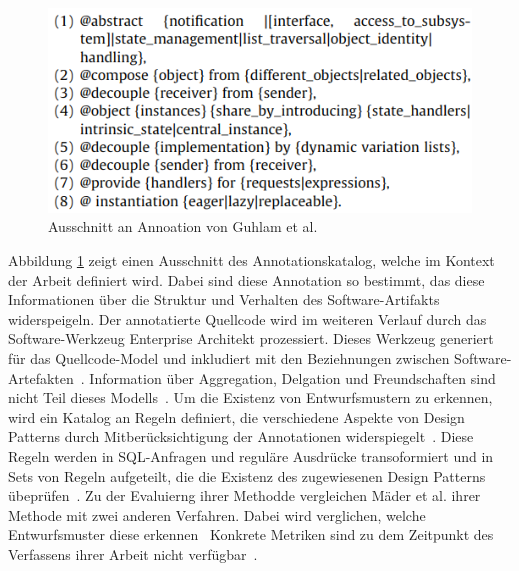 \begin{figure}[h]
    \centering
    \includegraphics{figures/annotations.png}
    \caption{Ausschnitt an Annoation von Guhlam et al.}
    \label{fig:annotations}
\end{figure}

Abbildung \ref{fig:annotations} zeigt einen Ausschnitt des Annotationskatalog, welche im Kontext der Arbeit definiert wird. Dabei sind diese Annotation so bestimmt, das diese Informationen über die Struktur und Verhalten des Software-Artifakts widerspeigeln.
Der annotatierte Quellcode wird im weiteren Verlauf durch das Software-Werkzeug Enterprise Architekt prozessiert. Dieses Werkzeug generiert für das Quellcode-Model und inkludiert mit den Beziehnungen zwischen Software-Artefakten~\cite[S. 521]{Ghula-2010}. Information über Aggregation, Delgation und Freundschaften sind nicht Teil dieses Modells~\cite[S. 521]{Ghula-2010}.
Um die Existenz von Entwurfsmustern zu erkennen, wird ein Katalog an Regeln definiert, die verschiedene Aspekte von Design Patterns durch Mitberücksichtigung der Annotationen widerspiegelt~\cite[S. 523]{Ghula-2010}. Diese Regeln werden in SQL-Anfragen und reguläre Ausdrücke transoformiert und in Sets von Regeln aufgeteilt, die die Existenz des zugewiesenen Design Patterns übeprüfen~\cite[S. 523]{Ghula-2010}.  
Zu der Evaluierng ihrer Methodde vergleichen Mäder et al. ihrer Methode mit zwei anderen Verfahren. Dabei wird verglichen, welche Entwurfsmuster diese erkennen~\cite[S. 525]{Ghula-2010}
Konkrete Metriken sind zu dem Zeitpunkt des Verfassens ihrer Arbeit nicht verfügbar~\cite[S. 525]{Ghula-2010}.

\pagebreak

